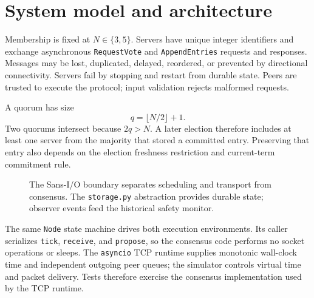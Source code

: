 \documentclass[10pt,a4paper]{article}
\newcommand{\rpc}[1]{\mbox{\texttt{#1}}}
\begin{document}
\section{System model and architecture}
Membership is fixed at $N\in\{3,5\}$. Servers have unique integer identifiers and
exchange asynchronous \rpc{RequestVote} and \rpc{AppendEntries} requests and responses.
Messages may be lost, duplicated, delayed, reordered, or prevented by directional
connectivity. Servers fail by stopping and restart from durable state. Peers are
trusted to execute the protocol; input validation rejects malformed requests.

A quorum has size
\[
q = \lfloor N / 2 \rfloor + 1.
\]
Two quorums intersect because $2q > N$. A later election therefore includes at
least one server from the majority that stored a committed entry. Preserving
that entry also depends on the election freshness restriction and current-term
commitment rule.

\begin{figure}[htbp]\centering
{}
\caption{The Sans-I/O boundary separates scheduling and transport from consensus.
The \texttt{storage.py} abstraction provides durable state; observer events feed
the historical safety monitor.}
\end{figure}

The same \texttt{Node} state machine drives both execution environments.
Its caller serializes \texttt{tick}, \texttt{receive}, and \texttt{propose}, so
the consensus code performs no socket operations or sleeps. The \texttt{asyncio}
TCP runtime supplies monotonic wall-clock time and independent outgoing peer
queues; the simulator controls virtual time and packet delivery. Tests therefore
exercise the consensus implementation used by the TCP runtime.
\end{document}
